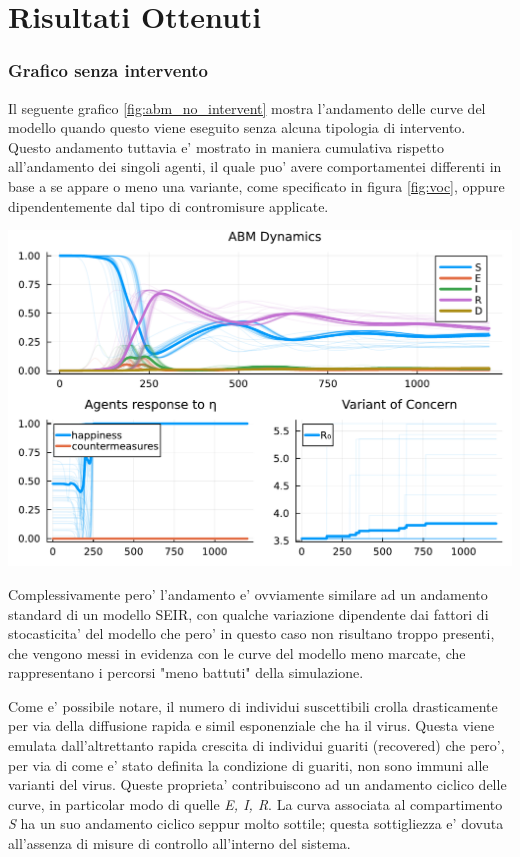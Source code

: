 \section{Risultati Ottenuti}

\subsubsection*{Grafico senza intervento}
Il seguente grafico \ref{fig:abm_no_intervent} mostra l'andamento delle curve del modello
quando questo viene eseguito senza alcuna tipologia di intervento. Questo andamento tuttavia e' mostrato 
in maniera cumulativa rispetto all'andamento dei singoli agenti, il quale puo' avere comportamentei 
differenti in base a se appare o meno una variante, come specificato in figura \ref{fig:voc}, oppure 
dipendentemente dal tipo di contromisure applicate. 

\begin{minipage}{\linewidth}
	\centering
	\includegraphics[width=\textwidth]{img/SocialNetworkABM_NO_CONTROL.pdf}
	\label{fig:abm_no_intervent}
\end{minipage}

Complessivamente pero' l'andamento e' ovviamente similare ad un andamento standard di un modello 
SEIR, con qualche variazione dipendente dai fattori di stocasticita' del modello che pero'
in questo caso non risultano troppo presenti, che vengono messi in evidenza con le curve del modello 
meno marcate, che rappresentano i percorsi "meno battuti" della simulazione.

Come e' possibile notare, il numero di individui suscettibili crolla drasticamente
per via della diffusione rapida e simil esponenziale che ha il virus. Questa viene emulata
dall'altrettanto rapida crescita di individui guariti (recovered) che pero', per via
di come e' stato definita la condizione di guariti, non sono immuni alle varianti del virus. 
Queste proprieta' contribuiscono ad un andamento ciclico delle curve, in particolar modo 
di quelle \emph{E, I, R}. La curva associata al compartimento \emph{S} ha un suo andamento
ciclico seppur molto sottile; questa sottigliezza e' dovuta all'assenza di misure di 
controllo all'interno del sistema.

